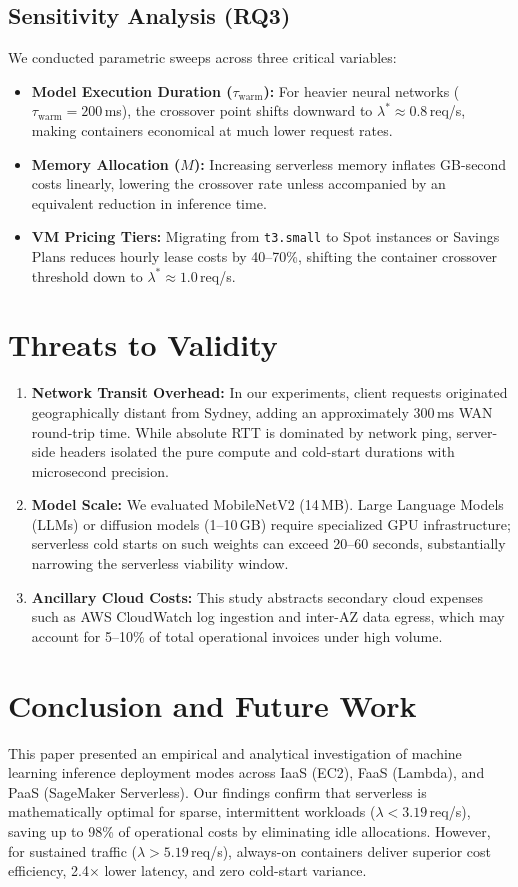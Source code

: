 \documentclass[conference]{IEEEtran}
\begin{document}
\subsection{Sensitivity Analysis (RQ3)}
We conducted parametric sweeps across three critical variables:
\begin{itemize}
    \item \textbf{Model Execution Duration ($\tau_{\text{warm}}$):} For heavier neural networks ($\tau_{\text{warm}} = 200$\,ms), the crossover point shifts downward to $\lambda^* \approx 0.8$\,req/s, making containers economical at much lower request rates.
    \item \textbf{Memory Allocation ($M$):} Increasing serverless memory inflates GB-second costs linearly, lowering the crossover rate unless accompanied by an equivalent reduction in inference time.
    \item \textbf{VM Pricing Tiers:} Migrating from \texttt{t3.small} to Spot instances or Savings Plans reduces hourly lease costs by 40--70\%, shifting the container crossover threshold down to $\lambda^* \approx 1.0$\,req/s.
\end{itemize}

\section{Threats to Validity}
\begin{enumerate}
    \item \textbf{Network Transit Overhead:} In our experiments, client requests originated geographically distant from Sydney, adding an approximately 300\,ms WAN round-trip time. While absolute RTT is dominated by network ping, server-side headers isolated the pure compute and cold-start durations with microsecond precision.
    \item \textbf{Model Scale:} We evaluated MobileNetV2 (14\,MB). Large Language Models (LLMs) or diffusion models (1--10\,GB) require specialized GPU infrastructure; serverless cold starts on such weights can exceed 20--60 seconds, substantially narrowing the serverless viability window.
    \item \textbf{Ancillary Cloud Costs:} This study abstracts secondary cloud expenses such as AWS CloudWatch log ingestion and inter-AZ data egress, which may account for 5--10\% of total operational invoices under high volume.
\end{enumerate}

\section{Conclusion and Future Work}
This paper presented an empirical and analytical investigation of machine learning inference deployment modes across IaaS (EC2), FaaS (Lambda), and PaaS (SageMaker Serverless). Our findings confirm that serverless is mathematically optimal for sparse, intermittent workloads ($\lambda < 3.19$\,req/s), saving up to 98\% of operational costs by eliminating idle allocations. However, for sustained traffic ($\lambda > 5.19$\,req/s), always-on containers deliver superior cost efficiency, 2.4$\times$ lower latency, and zero cold-start variance.
\end{document}
